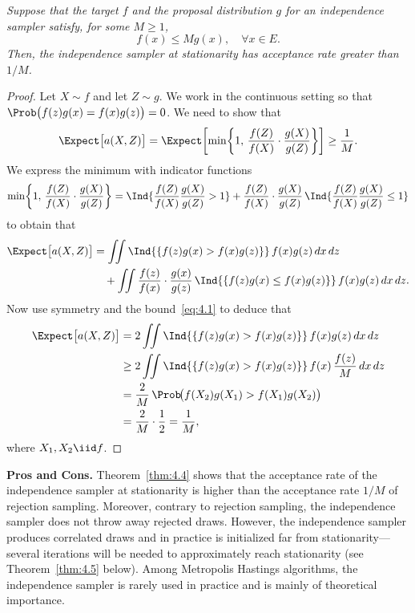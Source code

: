 \begin{theorem}
\label{thm:4.4}
\textit{Suppose that the target $f$ and the
proposal distribution $g$ for an independence sampler satisfy, for some $M \geq 1$,}
\begin{equation}
  f(x) \leq M g(x), \quad \forall x \in E.
  \label{eq:4.1}
\end{equation}
\textit{Then, the independence sampler at stationarity has acceptance rate greater than $1/M$.}
\end{theorem}

\begin{proof}
Let $X \sim f$ and let $Z \sim g$. We work in the continuous setting so that $\Prob\bigl(f(z)g(x) = f(x)g(z)\bigr) = 0$. We need to show that
\[
  \Expect\bigl[a(X,Z)\bigr]
  = \Expect\!\left[\min\!\left\{1,\, \frac{f(Z)}{f(X)} \cdot \frac{g(X)}{g(Z)}\right\}\right]
  \geq \frac{1}{M}.
\]
We express the minimum with indicator functions
\[
  \min\!\left\{1,\, \frac{f(Z)}{f(X)} \cdot \frac{g(X)}{g(Z)}\right\}
  = \Ind{\frac{f(Z)}{f(X)} \frac{g(X)}{g(Z)} > 1}
  + \frac{f(Z)}{f(X)} \cdot \frac{g(X)}{g(Z)}\, \Ind{\frac{f(Z)}{f(X)} \frac{g(X)}{g(Z)} \leq 1}
\]
to obtain that
\begin{align*}
  \Expect\bigl[a(X,Z)\bigr]
  &= \iint \Ind{\{f(z)g(x) > f(x)g(z)\}}\, f(x)g(z)\, dx\, dz \\
  &\quad + \iint \frac{f(z)}{f(x)} \cdot \frac{g(x)}{g(z)}\, \Ind{\{f(z)g(x) \leq f(x)g(z)\}}\, f(x)g(z)\, dx\, dz.
\end{align*}
Now use symmetry and the bound~\eqref{eq:4.1} to deduce that
\begin{align*}
  \Expect\bigl[a(X,Z)\bigr]
  &= 2\iint \Ind{\{f(z)g(x) > f(x)g(z)\}}\, f(x)g(z)\, dx\, dz \\
  &\geq 2\iint \Ind{\{f(z)g(x) > f(x)g(z)\}}\, f(x)\,\frac{f(z)}{M}\, dx\, dz \\
  &= \frac{2}{M}\,\Prob\!\bigl(f(X_2)g(X_1) > f(X_1)g(X_2)\bigr) \\
  &= \frac{2}{M} \cdot \frac{1}{2} = \frac{1}{M},
\end{align*}
where $X_1, X_2 \iid f$.
\end{proof}

\medskip
\noindent\textbf{Pros and Cons.}
Theorem~\ref{thm:4.4} shows that the acceptance rate of the independence sampler at
stationarity is higher than the acceptance rate $1/M$ of rejection sampling. Moreover, contrary
to rejection sampling, the independence sampler does not throw away rejected draws. However, the independence sampler produces correlated draws and in practice is initialized far
from stationarity---several iterations will be needed to approximately reach stationarity (see
Theorem~\ref{thm:4.5} below). Among Metropolis Hastings algorithms, the independence sampler is
rarely used in practice and is mainly of theoretical importance.

